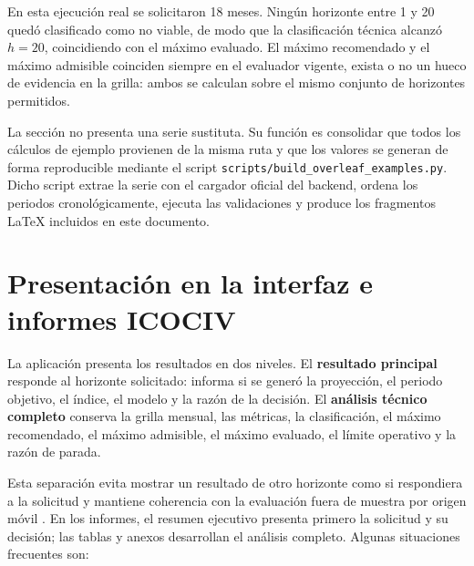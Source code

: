 ﻿\documentclass[12pt,letterpaper]{article}
\begin{document}
En esta ejecución real se solicitaron 18 meses. Ningún horizonte entre 1 y 20 quedó clasificado como no viable, de modo que la clasificación técnica alcanzó \(h=20\), coincidiendo con el máximo evaluado. El máximo recomendado y el máximo admisible coinciden siempre en el evaluador vigente, exista o no un hueco de evidencia en la grilla: ambos se calculan sobre el mismo conjunto de horizontes permitidos.

La sección no presenta una serie sustituta. Su función es consolidar que todos los cálculos de ejemplo provienen de la misma ruta y que los valores se generan de forma reproducible mediante el script \texttt{scripts/build\_overleaf\_examples.py}. Dicho script extrae la serie con el cargador oficial del backend, ordena los periodos cronológicamente, ejecuta las validaciones y produce los fragmentos LaTeX incluidos en este documento.

\section{Presentación en la interfaz e informes ICOCIV}

La aplicación presenta los resultados en dos niveles. El \textbf{resultado principal} responde al horizonte solicitado: informa si se generó la proyección, el periodo objetivo, el índice, el modelo y la razón de la decisión. El \textbf{análisis técnico completo} conserva la grilla mensual, las métricas, la clasificación, el máximo recomendado, el máximo admisible, el máximo evaluado, el límite operativo y la razón de parada.

Esta separación evita mostrar un resultado de otro horizonte como si respondiera a la solicitud y mantiene coherencia con la evaluación fuera de muestra por origen móvil \citep{tashman2000}. En los informes, el resumen ejecutivo presenta primero la solicitud y su decisión; las tablas y anexos desarrollan el análisis completo. Algunas situaciones frecuentes son:
\end{document}
